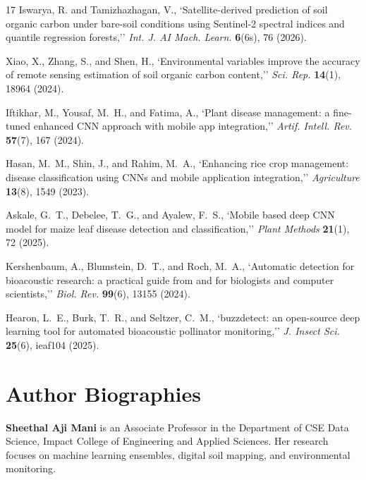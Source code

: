 \documentclass[a4paper,10pt]{article}
\begin{document}
\begin{thebibliography}{17}
Iswarya, R. and Tamizhazhagan, V., `Satellite-derived prediction of soil organic carbon under bare-soil conditions using Sentinel-2 spectral indices and quantile regression forests,'' {\itshape Int. J. AI Mach. Learn.} {\bfseries 6}(6s), 76 (2026).

Xiao, X., Zhang, S., and Shen, H., `Environmental variables improve the accuracy of remote sensing estimation of soil organic carbon content,'' {\itshape Sci. Rep.} {\bfseries 14}(1), 18964 (2024).

Iftikhar, M., Yousaf, M.~H., and Fatima, A., `Plant disease management: a fine-tuned enhanced CNN approach with mobile app integration,'' {\itshape Artif. Intell. Rev.} {\bfseries 57}(7), 167 (2024).

Hasan, M.~M., Shin, J., and Rahim, M.~A., `Enhancing rice crop management: disease classification using CNNs and mobile application integration,'' {\itshape Agriculture} {\bfseries 13}(8), 1549 (2023).

Askale, G.~T., Debelee, T.~G., and Ayalew, F.~S., `Mobile based deep CNN model for maize leaf disease detection and classification,'' {\itshape Plant Methods} {\bfseries 21}(1), 72 (2025).

Kershenbaum, A., Blumstein, D.~T., and Roch, M.~A., `Automatic detection for bioacoustic research: a practical guide from and for biologists and computer scientists,'' {\itshape Biol. Rev.} {\bfseries 99}(6), 13155 (2024).

Hearon, L.~E., Burk, T.~R., and Seltzer, C.~M., `buzzdetect: an open-source deep learning tool for automated bioacoustic pollinator monitoring,'' {\itshape J. Insect Sci.} {\bfseries 25}(6), ieaf104 (2025).
\end{thebibliography}

\section*{Author Biographies}



\textbf{Sheethal Aji Mani} is an Associate Professor in the Department of CSE Data Science, Impact College of Engineering and Applied Sciences. Her research focuses on machine learning ensembles, digital soil mapping, and environmental monitoring.
\end{document}
